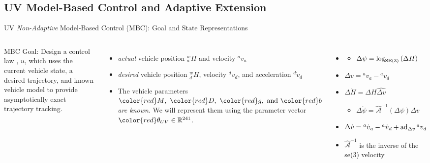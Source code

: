 \subsection{UV Model-Based Control and Adaptive Extension}
\begin{frame}{UV {\it Non-Adaptive} Model-Based Control (MBC): Goal and State Representations}

\begin{columns}
      
   MBC Goal: Design a control law ,
  {\color{green} $u$}, which uses the {\color{cyan} current vehicle
    state}, {\color{blue} a desired trajectory}, and {\color{red}
    known vehicle model} to provide asymptotically exact trajectory
  tracking.

      \begin{itemize}
      \item<2-> {\it actual} vehicle position {\color{cyan} ${^w_a}H$
        } and velocity {\color{cyan} ${^a}v_a$}
      \item<3-> {\it desired} vehicle position {\color{blue}
          ${^w_d}H$}, velocity {\color{blue} ${^d}v_d$}, and
        acceleration {\color{blue} ${^d}\dot{v}_d$}
      \item<4-> The vehicle parameters ${\color{red} M},~{\color{red}
          D},~{\color{red} g},~\text{and}~{\color{red} b}$ {\it are
          known}.  We will represent them using the parameter vector
        ${\color{red} \theta_{UV}}\in\rSp{241}$.
      \end{itemize} 




\begin{itemize}
\item<5-6>  
\begin{itemize}
\item<5-6> \alert<6>{$\Delta \psi=\log_{\SE3}\left(\Delta H \right)$}
\end{itemize}
\item<5-6> \alert<6>{$\Delta v={^a}v_a-{^a}v_d$}
\item<5> $\Delta \dot{H}=\Delta H\widehat{\Delta v}$
\begin{itemize}
\item $\Delta \dot{ \psi} = \hat{\mathcal{A}}^{-1}(\Delta \psi) \Delta v$
\end{itemize}
\item<5> $\Delta\dot{ v} = {^a}\dot{v}{_a}-{^a}\dot{v}{_d}+\operatorname{ad}_{\Delta v} {^a}v_d$
\item<5> $\hat{\mathcal{A}}^{-1}$ is the inverse of the se(3) velocity  
\end{itemize}



\end{columns}
\end{frame}
